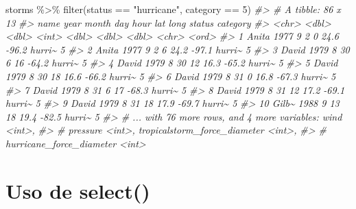 \documentclass[
]{book}
\newenvironment{Shaded}{\begin{snugshade}}{\end{snugshade}}
\newcommand{\CommentTok}[1]{\textcolor[rgb]{0.56,0.35,0.01}{\textit{#1}}}
\newcommand{\DecValTok}[1]{\textcolor[rgb]{0.00,0.00,0.81}{#1}}
\newcommand{\FunctionTok}[1]{\textcolor[rgb]{0.00,0.00,0.00}{#1}}
\newcommand{\NormalTok}[1]{#1}
\newcommand{\SpecialCharTok}[1]{\textcolor[rgb]{0.00,0.00,0.00}{#1}}
\newcommand{\StringTok}[1]{\textcolor[rgb]{0.31,0.60,0.02}{#1}}
\begin{document}
\begin{Shaded}
\begin{Highlighting}[]
\NormalTok{storms }\SpecialCharTok{\%\textgreater{}\%} 
  \FunctionTok{filter}\NormalTok{(status }\SpecialCharTok{==} \StringTok{"hurricane"}\NormalTok{,}
\NormalTok{         category }\SpecialCharTok{==} \DecValTok{5}\NormalTok{)}
\CommentTok{\#\textgreater{} \# A tibble: 86 x 13}
\CommentTok{\#\textgreater{}    name   year month   day  hour   lat  long status category}
\CommentTok{\#\textgreater{}    \textless{}chr\textgreater{} \textless{}dbl\textgreater{} \textless{}dbl\textgreater{} \textless{}int\textgreater{} \textless{}dbl\textgreater{} \textless{}dbl\textgreater{} \textless{}dbl\textgreater{} \textless{}chr\textgreater{}  \textless{}ord\textgreater{}   }
\CommentTok{\#\textgreater{}  1 Anita  1977     9     2     0  24.6 {-}96.2 hurri\textasciitilde{} 5       }
\CommentTok{\#\textgreater{}  2 Anita  1977     9     2     6  24.2 {-}97.1 hurri\textasciitilde{} 5       }
\CommentTok{\#\textgreater{}  3 David  1979     8    30     6  16   {-}64.2 hurri\textasciitilde{} 5       }
\CommentTok{\#\textgreater{}  4 David  1979     8    30    12  16.3 {-}65.2 hurri\textasciitilde{} 5       }
\CommentTok{\#\textgreater{}  5 David  1979     8    30    18  16.6 {-}66.2 hurri\textasciitilde{} 5       }
\CommentTok{\#\textgreater{}  6 David  1979     8    31     0  16.8 {-}67.3 hurri\textasciitilde{} 5       }
\CommentTok{\#\textgreater{}  7 David  1979     8    31     6  17   {-}68.3 hurri\textasciitilde{} 5       }
\CommentTok{\#\textgreater{}  8 David  1979     8    31    12  17.2 {-}69.1 hurri\textasciitilde{} 5       }
\CommentTok{\#\textgreater{}  9 David  1979     8    31    18  17.9 {-}69.7 hurri\textasciitilde{} 5       }
\CommentTok{\#\textgreater{} 10 Gilb\textasciitilde{}  1988     9    13    18  19.4 {-}82.5 hurri\textasciitilde{} 5       }
\CommentTok{\#\textgreater{} \# ... with 76 more rows, and 4 more variables: wind \textless{}int\textgreater{},}
\CommentTok{\#\textgreater{} \#   pressure \textless{}int\textgreater{}, tropicalstorm\_force\_diameter \textless{}int\textgreater{},}
\CommentTok{\#\textgreater{} \#   hurricane\_force\_diameter \textless{}int\textgreater{}}
\end{Highlighting}
\end{Shaded}

\hypertarget{uso-de-select}{%
\section{Uso de select()}\label{uso-de-select}}
\end{document}
